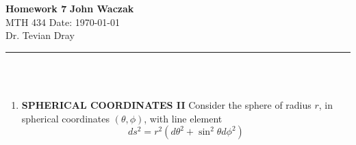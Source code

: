 \documentclass[a4paper, 11pt]{article}
\begin{document}
\noindent
\large\textbf{Homework 7} \hfill \textbf{John Waczak} \\
\normalsize MTH 434 \hfill  Date: \today \\
Dr. Tevian Dray %
\par\noindent\rule{\textwidth}{0.4pt} \\\\



\begin{enumerate}[leftmargin=0em, label=\textbf{\arabic*}]
\item \textbf{SPHERICAL COORDINATES II}
  Consider the sphere of radius $r$, in spherical coordinates $(\theta, \phi)$,
  with line element
  \begin{equation}
    ds^2 = r^2(d\theta^2+\sin^2\theta d\phi^2)
  \end{equation}
  


\end{enumerate}
\end{document}
